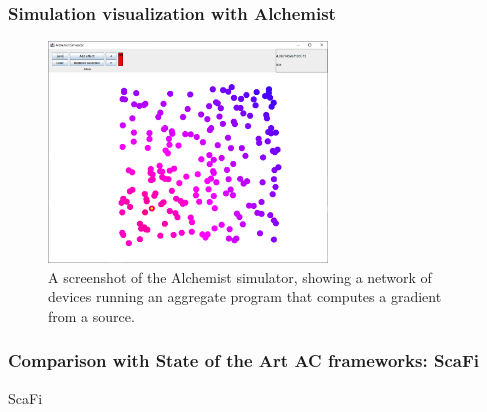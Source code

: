 \begin{frame}
    \frametitle{Simulation visualization with Alchemist}
    \begin{figure}
        \label{fig:alchemist-demo}
        \centering
        \includegraphics[width=0.66\textwidth]{figures/alchemist-demo.png}
        \caption{A screenshot of the Alchemist simulator, showing a network of devices running an aggregate program that computes a gradient from a source.}
    \end{figure}
\end{frame}

%         

%         

\begin{frame}
    \frametitle{Comparison with State of the Art \ac{AC} frameworks: ScaFi}
    \begin{exampleblock}{ScaFi}
        
    \end{exampleblock}
\end{frame}

